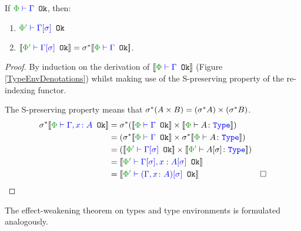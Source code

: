 \begin{framed}
    \begin{theorem}\label{EffectSubstitutionOnTypeEnvs}
        If $\wellformedok{\P}{\G}$, then:
        \begin{enumerate}[label=\roman*.]
            \item $\wellformedok{\P'}{\G\ssi}$
            \item $\deno{\wellformedok{\P'}{\G\ssi}} = \si\star\deno{\wellformedok{\P}{\G}}$.
        \end{enumerate}
         
    \end{theorem}
    
    \begin{proof}
        By induction on the derivation of $\deno{\wellformedok{\P}{\G}}$ (Figure \ref{TypeEnvDenotations}) whilst making use of the S-preserving property of the re-indexing functor.
            
        \case{\envextend}
        The S-preserving property means that $\sigma^*(A \times B) = (\sigma^* A)\times (\sigma^* B)$.
        \begin{align*}
           \si\star\deno{\wellformedok{\P}{\gax}} &= \si\star(\deno{\wellformedok{\P}{\G}} \times \deno{\typerelation{\P}{A}{\type}}) \\
           & = (\si\star\deno{\wellformedok{\P}{\G}} \times \si\star\deno{\typerelation{\P}{A}{\type}})\\
            & = (\deno{\wellformedok{\P'}{\G\ssi}} \times \deno{\typerelation{\P'}{A\ssi}{\type}})\\
            & = \deno{\wellformedok{\P'}{\G\ssi, x: A\ssi}}\\
            & = \deno{\wellformedok{\P'}{(\gax)\ssi}} & \square
        \end{align*}
    \end{proof}
    
\end{framed}

The effect-weakening theorem on types and type environments is formulated analogously.

